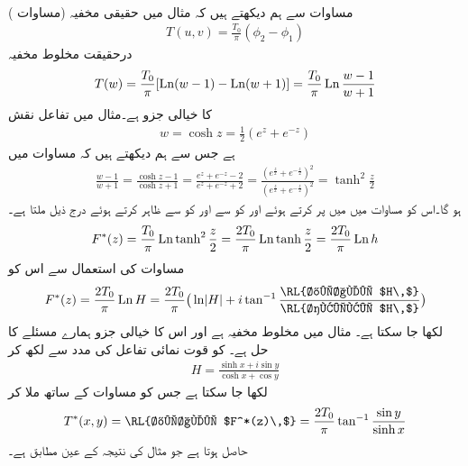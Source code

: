\quad {}\\
مساوات  سے ہم دیکھتے ہیں کہ مثال  میں حقیقی مخفیہ (مساوات )
\begin{align*}
T(u,v)=\frac{T_0}{\pi}(\phi_2-\phi_1)
\end{align*}
درحقیقت مخلوط مخفیہ
\begin{align}\label{مساوات_نقش_مخلوط_مخفی_قوہ_مثال_الف}
T(w)=\frac{T_0}{\pi}[\operatorname{Ln}(w-1)-\operatorname{Ln}(w+1)]=\frac{T_0}{\pi}\operatorname{Ln}\frac{w-1}{w+1}
\end{align}
کا خیالی جزو ہے۔مثال  میں تفاعل نقش
\begin{align*}
w=\cosh z=\frac{1}{2}(e^z+e^{-z})
\end{align*}
ہے جس سے ہم دیکھتے ہیں کہ مساوات  میں
\begin{align*}
\frac{w-1}{w+1}=\frac{\cosh z-1}{\cosh z+1}=\frac{e^z+e^{-z}-2}{e^z+e^{-z}+2}=\frac{(e^{\frac{z}{2}}+e^{-\frac{z}{2}})^2}{(e^{\frac{z}{2}}+e^{-\frac{z}{2}})^2}=\tanh^2 \frac{z}{2}
\end{align*}
ہو گا۔اس کو مساوات  میں میں پر کرتے ہوئے اور  کو  سے اور  کو  سے  ظاہر کرتے ہوئے  درج ذیل ملتا ہے۔
\begin{align}
F^*(z)=\frac{T_0}{\pi}\operatorname{Ln} \tanh^2\frac{z}{2}=\frac{2T_0}{\pi}\operatorname{Ln} \tanh \frac{z}{2}=\frac{2T_0}{\pi} \operatorname{Ln} h
\end{align}
مساوات  کی استعمال سے اس کو
\begin{align}\label{مساوات_نقش_ایک_حل}
F^*(z)=\frac{2T_0}{\pi} \Ln H=\frac{2T_0}{\pi} \big(\ln\abs{H}+i\tan^{-1}\frac{\text{\RL{خیالی $H\,$}}}{\text{\RL{حقیقی $H\,$}}}\big)
\end{align}
لکھا جا سکتا ہے۔  مثال  میں مخلوط مخفیہ ہے اور اس کا خیالی جزو ہمارے مسئلے کا حل ہے۔ کو قوت نمائی تفاعل کی مدد سے لکھ کر
\begin{align}\label{مساوات_نقش_حل_دوسری_شکل}
H=\frac{\sinh x+i\sin y}{\cosh x+\cos y}
\end{align}
لکھا جا سکتا ہے جس کو مساوات  کے ساتھ ملا کر
\begin{align*}
T^*(x,y)=\text{\RL{خیالی $F^*(z)\,$}}=\frac{2T_0}{\pi}\tan^{-1} \frac{\sin y}{\sinh x}
\end{align*}
حاصل ہوتا  ہے جو مثال  کی نتیجہ کے عین مطابق ہے۔

